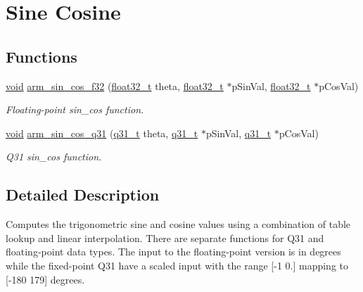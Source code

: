 \hypertarget{group___sin_cos}{\section{Sine Cosine}
\label{group___sin_cos}
}
\subsection*{Functions}
\begin{DoxyCompactItemize}
\item 
\hyperlink{group___n_a_m_e_ga18028b8badbf1ea7e704ccac3c488e82}{void} \hyperlink{group___sin_cos_ga4420d45c37d58c310ef9ae1b5fe58020}{arm\-\_\-sin\-\_\-cos\-\_\-f32} (\hyperlink{arm__math_8h_a4611b605e45ab401f02cab15c5e38715}{float32\-\_\-t} theta, \hyperlink{arm__math_8h_a4611b605e45ab401f02cab15c5e38715}{float32\-\_\-t} $\ast$p\-Sin\-Val, \hyperlink{arm__math_8h_a4611b605e45ab401f02cab15c5e38715}{float32\-\_\-t} $\ast$p\-Cos\-Val)
\begin{DoxyCompactList}\small\item\em Floating-\/point sin\-\_\-cos function. \end{DoxyCompactList}\item 
\hyperlink{group___n_a_m_e_ga18028b8badbf1ea7e704ccac3c488e82}{void} \hyperlink{group___sin_cos_gae9e4ddebff9d4eb5d0a093e28e0bc504}{arm\-\_\-sin\-\_\-cos\-\_\-q31} (\hyperlink{arm__math_8h_adc89a3547f5324b7b3b95adec3806bc0}{q31\-\_\-t} theta, \hyperlink{arm__math_8h_adc89a3547f5324b7b3b95adec3806bc0}{q31\-\_\-t} $\ast$p\-Sin\-Val, \hyperlink{arm__math_8h_adc89a3547f5324b7b3b95adec3806bc0}{q31\-\_\-t} $\ast$p\-Cos\-Val)
\begin{DoxyCompactList}\small\item\em Q31 sin\-\_\-cos function. \end{DoxyCompactList}\end{DoxyCompactItemize}


\subsection{Detailed Description}
Computes the trigonometric sine and cosine values using a combination of table lookup and linear interpolation. There are separate functions for Q31 and floating-\/point data types. The input to the floating-\/point version is in degrees while the fixed-\/point Q31 have a scaled input with the range \mbox{[}-\/1 0.\mbox{]} mapping to \mbox{[}-\/180 179\mbox{]} degrees.

